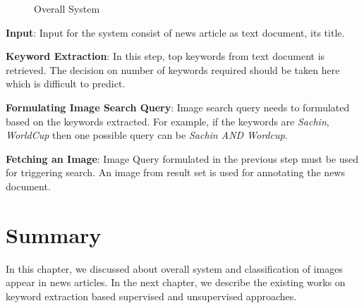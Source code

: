 \begin{figure}[h]
\begin{center}
\end{center}
\caption{Overall System}
\end{figure}

\noindent \textbf{Input}: Input for the system consist of news article as text document, its title. 

\noindent \textbf{Keyword Extraction}: In this step, top keywords from text document is retrieved. The decision on number of keywords required should be taken here which is difficult to predict.

\noindent \textbf{Formulating Image Search Query}: Image search query needs to formulated based on the keywords extracted. For example, if the keywords are \textit{Sachin}, \textit{WorldCup} then one possible query can be \textit{ Sachin AND Wordcup}. 

\noindent \textbf{Fetching an Image}: Image Query formulated in the previous step must be used for triggering search. An image from result set is used for annotating the news document.


\section{Summary}
In this chapter, we discussed about overall system and classification of images appear in news articles. In the next chapter, we describe the existing works on keyword extraction based supervised and unsupervised approaches.



